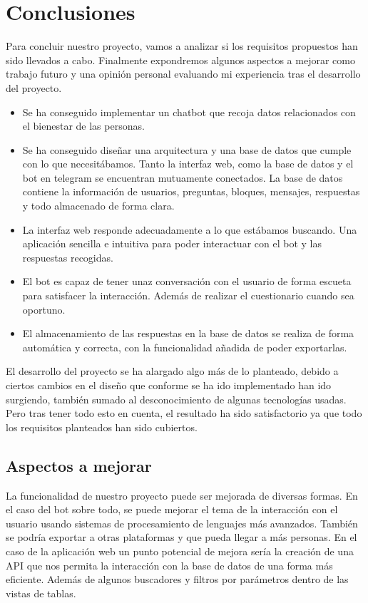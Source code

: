 \chapter{Conclusiones}

Para concluir nuestro proyecto, vamos a analizar si los requisitos propuestos han sido llevados a cabo. Finalmente expondremos algunos aspectos a mejorar como trabajo futuro y una opinión personal evaluando mi experiencia tras el desarrollo del proyecto. 

\begin{itemize}
    \item Se ha conseguido implementar un chatbot que recoja datos relacionados con el bienestar de las personas.
    \item Se ha conseguido diseñar una arquitectura y una base de datos que cumple con lo que necesitábamos. Tanto la interfaz web, como la base de datos y el bot en telegram se encuentran mutuamente conectados. La base de datos contiene la información  de usuarios, preguntas, bloques, mensajes, respuestas y todo almacenado de forma clara. 
    \item La interfaz web responde adecuadamente a lo que estábamos buscando. Una aplicación sencilla e intuitiva para poder interactuar con el bot y las respuestas recogidas.
    \item El bot es capaz de tener unaz conversación con el usuario de forma escueta para satisfacer la interacción. Además de realizar el cuestionario cuando sea oportuno.
    \item El almacenamiento de las respuestas en la base de datos se realiza de forma automática y correcta, con la funcionalidad añadida de poder exportarlas.
\end{itemize}

El desarrollo del proyecto se ha alargado algo más de lo planteado, debido a ciertos cambios en el diseño que conforme se ha ido implementado han ido surgiendo, también sumado al desconocimiento de algunas tecnologías usadas. Pero tras tener todo esto en cuenta, el resultado ha sido satisfactorio ya que todo los requisitos planteados han sido cubiertos. 



 \section{Aspectos a mejorar}

La funcionalidad de nuestro proyecto puede ser mejorada de diversas formas. En el caso del bot sobre todo, se puede mejorar el tema de la interacción con el usuario usando sistemas de procesamiento de lenguajes más avanzados. También se podría exportar a otras plataformas y que pueda llegar a más personas. En el caso de la aplicación web un punto potencial de mejora sería la creación de una API que nos permita la interacción con la base de datos de una forma más eficiente. Además de algunos buscadores y filtros por parámetros dentro de las vistas de tablas. 


